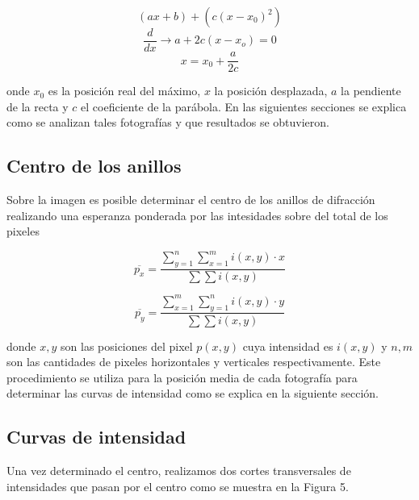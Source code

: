 \documentclass[a4paper, 10pt, spanish]{article}
\numberwithin{equation}{section}
\numberwithin{table}{section}
\begin{document}
\begin{equation}
(ax+b) + (c(x-x_0)^2) \nonumber  
\end{equation}
\begin{equation}
\frac{d}{dx} \rightarrow a + 2c(x-x_o) = 0 \nonumber 
\end{equation}
\begin{equation}
x = x_0 + \frac{a}{2c}
\end{equation}

onde $x_0$ es la posición real del máximo, $x$ la posición desplazada, $a$ la pendiente de la recta y $c$ el coeficiente de la parábola.
En las siguientes secciones se explica como se analizan tales fotografías y que resultados se obtuvieron.

\subsection{Centro de los anillos}
Sobre la imagen es posible determinar el centro de los anillos de difracción realizando una esperanza ponderada por las intesidades sobre del total de los pixeles

\begin{equation}
  \overline{p_x} = \frac{\sum_{y=1}^{n}\sum_{x = 1}^{m} i(x,y)\cdot x}{\sum \sum i(x,y)}
\end{equation}

\begin{equation}
  \overline{p_y} = \frac{\sum_{x=1}^{m}\sum_{y = 1}^{n} i(x,y)\cdot y}{\sum \sum i(x,y)}
\end{equation}

donde $x,y$ son las posiciones del pixel $p(x,y)$ cuya intensidad es $i(x,y)$ y $n,m$ son las cantidades de pixeles horizontales y verticales respectivamente. Este procedimiento se utiliza para la posición media de cada fotografía para determinar las curvas de intensidad como se explica en la siguiente sección.

\subsection{Curvas de intensidad}
Una vez determinado el centro, realizamos dos cortes transversales de intensidades que pasan por el centro como se muestra en la Figura 5. 
\end{document}
